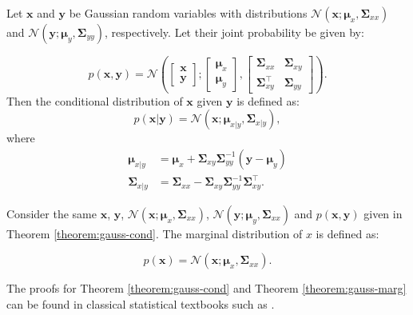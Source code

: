 \begin{theorem}\label{theorem:gauss-cond}
    Let $\mathbf{x}$ and $\mathbf{y}$ be Gaussian random variables with distributions $\mathscr{N}\left(\mathbf{x} ; \mathbf\mu_x, \mathbf\Sigma_{xx}\right)$ and $\mathscr{N}\left(\mathbf{y} ; \mathbf\mu_y, \mathbf\Sigma_{yy}\right)$, respectively. Let their joint probability be given by:

    \begin{equation*}
        p(\mathbf{x}, \mathbf{y}) = \mathscr{N}\left(
            \begin{bmatrix}
                \mathbf{x} \\
                \mathbf{y}
            \end{bmatrix};
            \begin{bmatrix}
                \boldsymbol\mu_x \\
                \boldsymbol\mu_y
            \end{bmatrix},
            \begin{bmatrix}
                \mathbf{\Sigma}_{xx} & \mathbf{\Sigma}_{xy} \\
                \mathbf{\Sigma}_{xy}^\intercal & \mathbf{\Sigma}_{yy}
            \end{bmatrix}
        \right).
    \end{equation*}
    Then the conditional distribution of $\mathbf{x}$ given $\mathbf{y}$ is defined as:
    \begin{equation}\label{eq:gauss-cond}
        p(\mathbf{x}|\mathbf{y}) =
        \mathscr{N}\left(\mathbf{x}; \boldsymbol\mu_{x|y}, \mathbf\Sigma_{x|y}\right),
    \end{equation}
    where
    \begin{align}
        \boldsymbol\mu_{x|y}
        &= \boldsymbol\mu_x + \mathbf{\Sigma}_{xy} \mathbf{\Sigma}_{yy}^{-1}(\mathbf{y} - \boldsymbol\mu_y) \\
        \mathbf\Sigma_{x|y} 
        &= \mathbf\Sigma_{xx} - \mathbf\Sigma_{xy}\mathbf\Sigma_{yy}^{-1}\mathbf\Sigma_{xy}^\intercal.\label{eq:gauss-cond-params}
    \end{align}
\end{theorem}

\begin{theorem}\label{theorem:gauss-marg}
    Consider the same $\mathbf{x}$, $\mathbf{y}$, $\mathscr{N}\left(\mathbf{x} ; \mathbf\mu_x, \mathbf\Sigma_{xx}\right)$, $\mathscr{N}\left(\mathbf{y} ; \mathbf\mu_y, \mathbf\Sigma_{xx}\right)$ and $p(\mathbf{x}, \mathbf{y})$ given in Theorem \ref{theorem:gauss-cond}. The marginal distribution of $x$ is defined as:

    \begin{equation*}
        p(\mathbf{x}) = \mathscr{N}\left(\mathbf{x} ; \mathbf\mu_x, \mathbf\Sigma_{xx}\right).
    \end{equation*}
\end{theorem}

The proofs for Theorem \ref{theorem:gauss-cond} and Theorem \ref{theorem:gauss-marg} can be found in classical statistical textbooks such as \cite[161--163]{johnsonAppliedMultivariateStatistical2007}.
